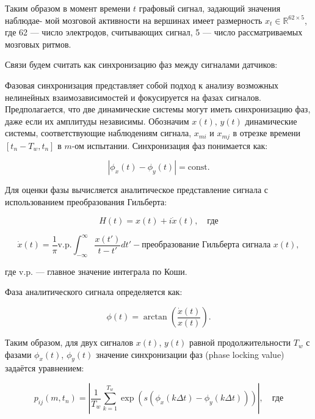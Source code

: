 \documentclass[12pt, twoside]{article}
\begin{document}
Таким образом в момент времени $t$ графовый сигнал, задающий значения наблюдае-
мой мозговой активности на вершинах имеет размерность $x_t \in \mathbb{R}^{62 \times 5}$, где 62 — число электродов, считывающих сигнал, 5 — число рассматриваемых мозговых ритмов.

Связи будем считать как синхронизацию фаз между сигналами датчиков:

Фазовая синхронизация представляет собой подход к анализу возможных нелинейных взаимозависимостей и фокусируется на фазах сигналов. Предполагается, что две динамические системы могут иметь синхронизацию фаз, даже если их амплитуды независимы. Обозначим \( x(t) \), \( y(t) \) динамические системы, соответствующие наблюдениям сигнала, \( x_{mi} \) и \( x_{mj} \) в отрезке времени \( [t_n - T_w, t_n] \) в \( m \)-ом испытании. Синхронизация фаз понимается как:

\begin{equation}
|\phi_x(t) - \phi_y(t)| = \text{const}.
\end{equation}

Для оценки фазы вычисляется аналитическое представление сигнала с использованием преобразования Гильберта:

\begin{equation}
H(t) = x(t) + i\dot{x}(t), \quad \text{где}
\end{equation}

\begin{equation}
\dot{x}(t) = \frac{1}{\pi} \text{v.p.} \int_{-\infty}^{\infty} \frac{x(t')}{t - t'} dt' - \text{преобразование Гильберта сигнала } x(t),
\end{equation}

\noindent где $\text{v.p.}$ — главное значение интеграла по Коши.

Фаза аналитического сигнала определяется как:

\begin{equation}
\phi(t) = \arctan \left( \frac{\dot{x}(t)}{x(t)} \right).
\end{equation}

Таким образом, для двух сигналов \( x(t) \), \( y(t) \) равной продолжительности \( T_w \) с фазами \( \phi_x(t) \), \( \phi_y(t) \) значение синхронизации фаз (phase locking value) \cite{ref18} задаётся уравнением:

\begin{equation}
p_{ij}(m, t_n) = \left| \frac{1}{T_w} \sum_{k=1}^{T_w} \exp \left( s(\phi_x(k \Delta t) - \phi_y(k \Delta t)) \right) \right|, \quad \text{где}
\end{equation}
\end{document}
